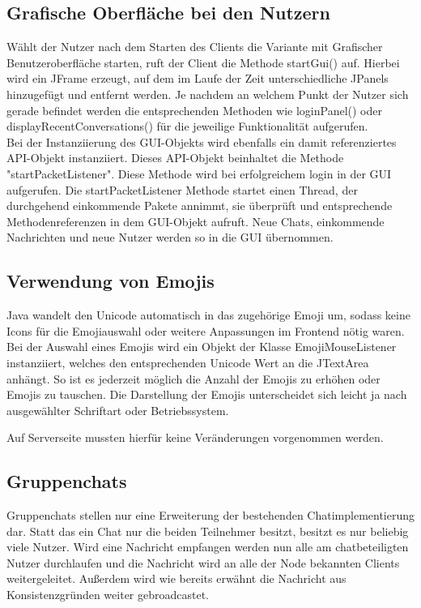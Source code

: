 
\author{Jan Grübener, Patrick Mischka}
\subsection{Grafische Oberfläche bei den Nutzern}
Wählt der Nutzer nach dem Starten des Clients die Variante mit Grafischer Benutzeroberfläche starten, ruft der Client die Methode startGui() auf. Hierbei wird ein JFrame erzeugt, auf dem im Laufe der Zeit unterschiedliche JPanels hinzugefügt und entfernt werden. Je nachdem an welchem Punkt der Nutzer sich gerade befindet werden die entsprechenden Methoden wie loginPanel() oder displayRecentConversations() für die jeweilige Funktionalität aufgerufen. \\
Bei der Instanziierung des GUI-Objekts wird ebenfalls ein damit referenziertes API-Objekt instanziiert. Dieses API-Objekt beinhaltet die Methode "startPacketListener". Diese Methode wird bei erfolgreichem login in der GUI aufgerufen. Die startPacketListener Methode startet einen Thread, der durchgehend einkommende Pakete annimmt, sie überprüft und entsprechende Methodenreferenzen in dem GUI-Objekt aufruft. Neue Chats, einkommende Nachrichten und neue Nutzer werden so in die GUI übernommen.\\
\author{Jan Grübener, Patrick Mischka}
\subsection{Verwendung von Emojis}
Java wandelt den Unicode automatisch in das zugehörige Emoji um, sodass keine Icons für die Emojiauswahl oder weitere Anpassungen im Frontend nötig waren. Bei der Auswahl eines Emojis wird ein Objekt der Klasse EmojiMouseListener instanziiert, welches den entsprechenden Unicode Wert an die JTextArea anhängt. So ist es jederzeit möglich die Anzahl der Emojis zu erhöhen oder Emojis zu tauschen. Die Darstellung der Emojis unterscheidet sich leicht ja nach ausgewählter Schriftart oder Betriebssystem. 

Auf Serverseite mussten hierfür keine Veränderungen vorgenommen werden.

\author{Matthias Vonend, Aaron Schweig, Troy Keßler}
\subsection{Gruppenchats}
Gruppenchats stellen nur eine Erweiterung der bestehenden Chatimplementierung dar. Statt das ein Chat nur die beiden Teilnehmer besitzt, besitzt es nur beliebig viele Nutzer. Wird eine Nachricht empfangen werden nun alle am chatbeteiligten Nutzer durchlaufen und die Nachricht wird an alle der Node bekannten Clients weitergeleitet. Außerdem wird wie bereits erwähnt die Nachricht aus Konsistenzgründen weiter gebroadcastet.

